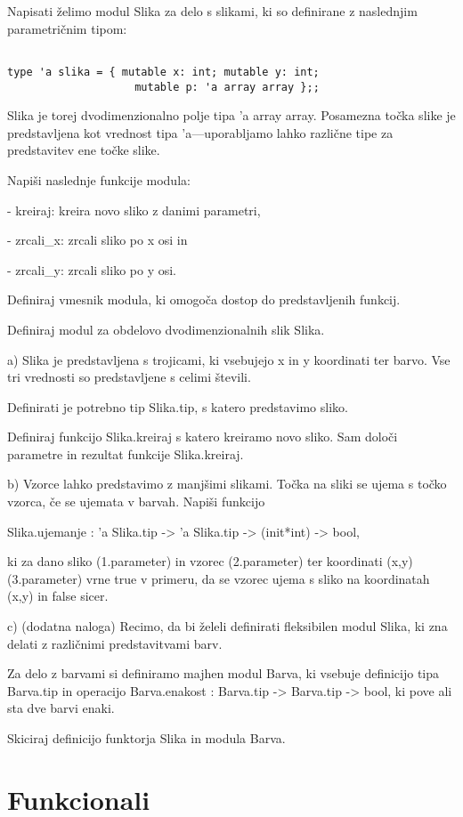 \begin{ex}
Napisati \v zelimo modul Slika za delo s slikami, ki so definirane z naslednjim parametri\v cnim tipom:

\begin{verbatim}

type 'a slika = { mutable x: int; mutable y: int;
					mutable p: 'a array array };; 
\end{verbatim}

Slika je torej dvodimenzionalno polje tipa 'a array array. Posamezna to\v cka slike je predstavljena kot vrednost tipa 'a---uporabljamo lahko razli\v cne tipe za predstavitev ene to\v cke slike.

Napi\v si naslednje funkcije modula:

- kreiraj: kreira novo sliko z danimi parametri,

- zrcali\_x: zrcali sliko po x osi in

- zrcali\_y: zrcali sliko po y osi.

Definiraj vmesnik modula, ki omogo\v ca dostop do predstavljenih funkcij.

\end{ex}
\begin{ex}
Definiraj modul za obdelovo dvodimenzionalnih slik Slika. 

a) Slika je predstavljena s trojicami, ki vsebujejo x in y koordinati ter barvo. Vse tri vrednosti so predstavljene s celimi \v stevili.   

Definirati je potrebno tip Slika.tip, s katero predstavimo sliko.

Definiraj funkcijo Slika.kreiraj s katero kreiramo novo sliko. Sam dolo\v ci parametre in rezultat funkcije Slika.kreiraj. 

b) Vzorce lahko predstavimo z manj\v simi slikami. To\v cka na sliki se ujema s to\v cko vzorca, \v ce se ujemata v barvah. Napi\v si funkcijo 

Slika.ujemanje : 'a Slika.tip -> 'a Slika.tip -> (init*int) -> bool, 

ki za dano sliko (1.parameter) in vzorec (2.parameter) ter koordinati (x,y) (3.parameter) vrne true v primeru, da se vzorec ujema s sliko na koordinatah (x,y) in false sicer.

c) (dodatna naloga) Recimo, da bi \v zeleli definirati fleksibilen modul Slika, ki zna delati z razli\v cnimi predstavitvami barv. 

Za delo z barvami si definiramo majhen modul Barva, ki vsebuje definicijo tipa Barva.tip in operacijo Barva.enakost : Barva.tip -> Barva.tip -> bool, ki pove ali sta dve barvi enaki. 

Skiciraj definicijo funktorja Slika in modula Barva.

\section{Funkcionali}


\end{ex}
